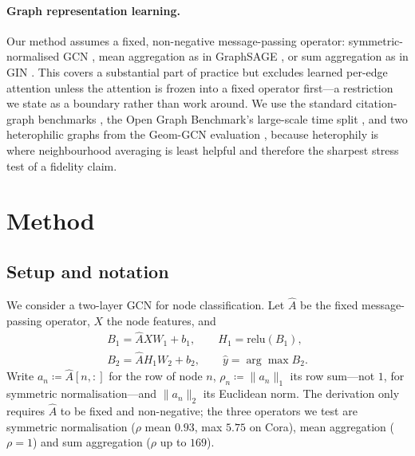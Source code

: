 \documentclass[10pt,twocolumn]{article}
\newcommand{\Ahat}{\hat{A}}
\newcommand{\Bone}{B_{1}}
\newcommand{\Btwo}{B_{2}}
\newcommand{\anorm}{\lVert a_{n}\rVert_{2}}
\newcommand{\rhon}{\rho_{n}}
\begin{document}
\paragraph{Graph representation learning.}
Our method assumes a fixed, non-negative message-passing operator: symmetric-normalised GCN
\citep{kipf2017semi}, mean aggregation as in GraphSAGE \citep{hamilton2017inductive}, or sum
aggregation as in GIN \citep{xu2019powerful}. This covers a substantial part of practice but excludes
learned per-edge attention \citep{velickovic2018graph} unless the attention is frozen into a fixed
operator first---a restriction we state as a boundary rather than work around. We use the standard
citation-graph benchmarks \citep{kipf2017semi}, the Open Graph Benchmark's large-scale time split
\citep{hu2020open}, and two heterophilic graphs from the Geom-GCN evaluation
\citep{pei2020geom,rozemberczki2021multi}, because heterophily is where neighbourhood averaging is
least helpful and therefore the sharpest stress test of a fidelity claim.
\section{Method}
\label{sec:method}

\subsection{Setup and notation}
\label{sec:setup}

We consider a two-layer GCN for node classification. Let $\Ahat$ be the fixed message-passing
operator, $X$ the node features, and
\begin{equation}
\begin{gathered}
\Bone = \Ahat X W_{1} + b_{1},\qquad H_{1} = \mathrm{relu}(\Bone),\\
\Btwo = \Ahat H_{1} W_{2} + b_{2},\qquad \hat{y} = \arg\max \Btwo .
\end{gathered}
\label{eq:gcn}
\end{equation}
Write $a_{n} \coloneqq \Ahat[n,:]$ for the row of node $n$, $\rhon \coloneqq \lVert a_{n}\rVert_{1}$
its row sum---not $1$, for symmetric normalisation---and $\anorm$ its Euclidean norm. The
derivation only requires $\Ahat$ to be fixed and non-negative; the three operators we test are
symmetric normalisation ($\rho$ mean $0.93$, max $5.75$ on Cora), mean aggregation ($\rho = 1$) and
sum aggregation ($\rho$ up to $169$).
\end{document}
